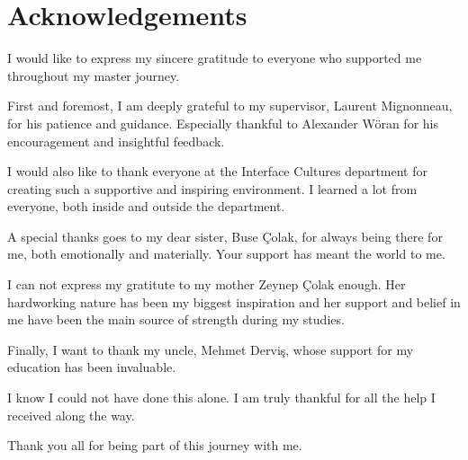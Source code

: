 \section*{Acknowledgements}
    I would like to express my sincere gratitude to everyone who supported me throughout my master journey.\par

    First and foremost, I am deeply grateful to my supervisor, Laurent Mignonneau, for his patience and guidance. Especially thankful to Alexander Wöran for his encouragement and insightful feedback.\par

    I would also like to thank everyone at the Interface Cultures department for creating such a supportive and inspiring environment. I learned a lot from everyone, both inside and outside the department.\par

    A special thanks goes to my dear sister, Buse Çolak, for always being there for me, both emotionally and materially. Your support has meant the world to me.\par

    I can not express my gratitute to my mother Zeynep Çolak enough. Her hardworking nature has been my biggest inspiration and her support and belief in me have been the main source of strength during my studies.\par

    Finally, I want to thank my uncle, Mehmet Derviş, whose support for my education has been invaluable.\par

    I know I could not have done this alone. I am truly thankful for all the help I received along the way.\par

    Thank you all for being part of this journey with me.\par